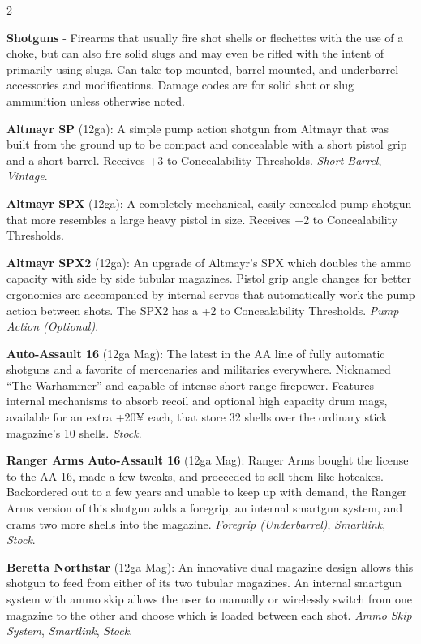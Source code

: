 \documentclass[
  oneside]{article}
\begin{document}
\begin{multicols}{2}

\textbf{Shotguns} - Firearms that usually fire
shot shells or flechettes with the use of a choke,
but can also fire solid slugs and may even be
rifled with the intent of primarily using slugs.
Can take top-mounted, barrel-mounted, and
underbarrel accessories and modifications. Damage
codes are for solid shot or slug ammunition unless
otherwise noted.

\textbf{Altmayr SP} (12ga): A simple pump action
shotgun from Altmayr that was built from the
ground up to be compact and concealable with a
short pistol grip and a short barrel. Receives +3
to Concealability Thresholds. \emph{Short Barrel},
\emph{Vintage}.

\textbf{Altmayr SPX} (12ga): A completely
mechanical, easily concealed pump shotgun that
more resembles a large heavy pistol in size.
Receives +2 to Concealability Thresholds.

\textbf{Altmayr SPX2} (12ga): An upgrade of
Altmayr's SPX which doubles the ammo capacity with
side by side tubular magazines. Pistol grip angle
changes for better ergonomics are accompanied by
internal servos that automatically work the pump
action between shots. The SPX2 has a +2 to
Concealability Thresholds. \emph{Pump Action
(Optional)}.

\textbf{Auto-Assault 16} (12ga Mag): The latest in
the AA line of fully automatic shotguns and a
favorite of mercenaries and militaries everywhere.
Nicknamed ``The Warhammer'' and capable of intense
short range firepower. Features internal
mechanisms to absorb recoil and optional high
capacity drum mags, available for an extra +20¥
each, that store 32 shells over the ordinary stick
magazine's 10 shells. \emph{Stock}.

\textbf{Ranger Arms Auto-Assault 16} (12ga Mag):
Ranger Arms bought the license to the AA-16, made
a few tweaks, and proceeded to sell them like
hotcakes. Backordered out to a few years and
unable to keep up with demand, the Ranger Arms
version of this shotgun adds a foregrip, an
internal smartgun system, and crams two more
shells into the magazine. \emph{Foregrip
(Underbarrel)}, \emph{Smartlink}, \emph{Stock}.

\textbf{Beretta Northstar} (12ga Mag): An
innovative dual magazine design allows this
shotgun to feed from either of its two tubular
magazines. An internal smartgun system with ammo
skip allows the user to manually or wirelessly
switch from one magazine to the other and choose
which is loaded between each shot. \emph{Ammo Skip
System}, \emph{Smartlink}, \emph{Stock}.


\end{multicols}
\end{document}
